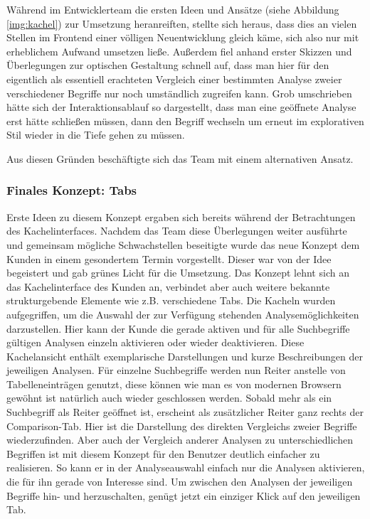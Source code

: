 Während im Entwicklerteam die ersten Ideen und Ansätze (siehe Abbildung \ref{img:kachel}) zur Umsetzung heranreiften, stellte sich heraus, dass dies an vielen Stellen im Frontend einer völligen Neuentwicklung gleich käme, sich also nur mit erheblichem Aufwand umsetzen ließe. Außerdem fiel anhand erster Skizzen und Überlegungen zur optischen Gestaltung schnell auf, dass man hier für den eigentlich als essentiell erachteten Vergleich einer bestimmten Analyse zweier verschiedener Begriffe nur noch umständlich zugreifen kann. Grob umschrieben hätte sich der Interaktionsablauf so dargestellt, dass man eine geöffnete Analyse erst hätte schließen müssen, dann den Begriff wechseln um erneut im explorativen Stil wieder in die Tiefe gehen zu müssen.

Aus diesen Gründen beschäftigte sich das Team mit einem alternativen Ansatz. 

\subsubsection{Finales Konzept: Tabs}
\label{sec:konzeptTabs}
Erste Ideen zu diesem Konzept ergaben sich bereits während der Betrachtungen des Kachelinterfaces. Nachdem das Team diese Überlegungen weiter ausführte und gemeinsam mögliche Schwachstellen beseitigte wurde das neue Konzept dem Kunden in einem gesondertem Termin vorgestellt. Dieser war von der Idee begeistert und gab grünes Licht für die Umsetzung.
Das Konzept lehnt sich an das Kachelinterface des Kunden an, verbindet aber auch weitere bekannte strukturgebende Elemente wie z.B. verschiedene Tabs. Die Kacheln wurden aufgegriffen, um die Auswahl der zur Verfügung stehenden Analysemöglichkeiten darzustellen. Hier kann der Kunde die gerade aktiven und für alle Suchbegriffe gültigen Analysen einzeln aktivieren oder wieder deaktivieren. Diese Kachelansicht enthält exemplarische Darstellungen und kurze Beschreibungen der jeweiligen Analysen. Für einzelne Suchbegriffe werden nun Reiter anstelle von Tabelleneinträgen genutzt, diese können wie man es von modernen Browsern gewöhnt ist natürlich auch wieder geschlossen werden. Sobald mehr als ein Suchbegriff als Reiter geöffnet ist, erscheint als zusätzlicher Reiter ganz rechts der Comparison-Tab. Hier ist die Darstellung des direkten Vergleichs zweier Begriffe wiederzufinden. Aber auch der Vergleich anderer Analysen zu unterschiedlichen Begriffen ist mit diesem Konzept für den Benutzer deutlich einfacher zu realisieren. So kann er in der Analyseauswahl einfach nur die Analysen aktivieren, die für ihn gerade von Interesse sind. Um zwischen den Analysen der jeweiligen Begriffe hin- und herzuschalten, genügt jetzt ein einziger Klick auf den jeweiligen Tab.

